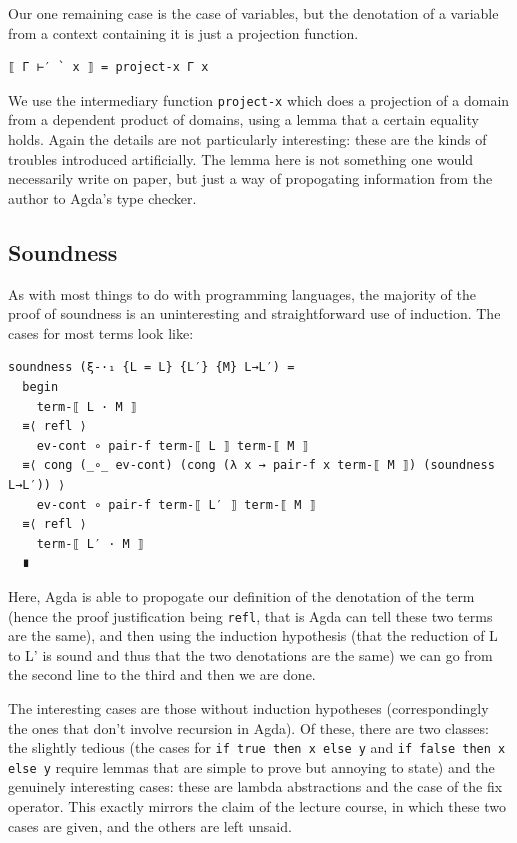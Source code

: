 \documentclass[12pt,a4paper,twoside,openright]{report}
\begin{document}
Our one remaining case is the case of variables, but the denotation of a variable from a context containing it is just a projection function. 
\begin{verbatim}
⟦ Γ ⊢′ ` x ⟧ = project-x Γ x
\end{verbatim}
We use the intermediary function \texttt{project-x} which does a projection of a domain from a dependent product of domains, using a lemma that a certain equality holds. Again the details are not particularly interesting: these are the kinds of troubles introduced artificially. The lemma here is not something one would necessarily write on paper, but just a way of propogating information from the author to Agda's type checker. 
\subsection{Soundness}
As with most things to do with programming languages, the majority of the proof of soundness is an uninteresting and straightforward use of induction. The cases for most terms look like:
\begin{verbatim}
soundness (ξ-·₁ {L = L} {L′} {M} L→L′) =
  begin
    term-⟦ L · M ⟧
  ≡⟨ refl ⟩
    ev-cont ∘ pair-f term-⟦ L ⟧ term-⟦ M ⟧
  ≡⟨ cong (_∘_ ev-cont) (cong (λ x → pair-f x term-⟦ M ⟧) (soundness L→L′)) ⟩
    ev-cont ∘ pair-f term-⟦ L′ ⟧ term-⟦ M ⟧
  ≡⟨ refl ⟩
    term-⟦ L′ · M ⟧
  ∎
\end{verbatim}
Here, Agda is able to propogate our definition of the denotation of the term (hence the proof justification being \texttt{refl}, that is Agda can tell these two terms are the same), and then using the induction hypothesis (that the reduction of L to L' is sound and thus that the two denotations are the same) we can go from the second line to the third and then we are done. 

The interesting cases are those without induction hypotheses (correspondingly the ones that don't involve recursion in Agda). Of these, there are two classes: the slightly tedious (the cases for \texttt{if true then x else y} and \texttt{if false then x else y} require lemmas that are simple to prove but annoying to state) and the genuinely interesting cases: these are lambda abstractions and the case of the fix operator. This exactly mirrors the claim of the lecture course, in which these two cases are given, and the others are left unsaid. 
\end{document}
